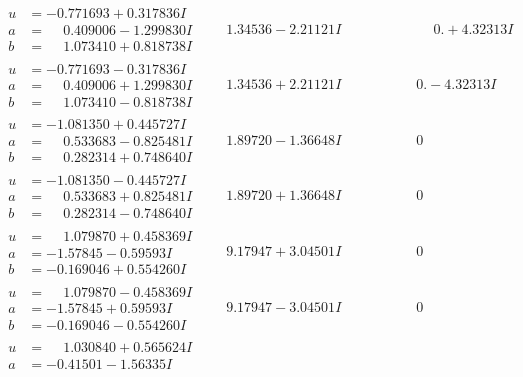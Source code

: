 \documentclass[1p]{elsarticle_modified}
\theoremstyle{definition}
\begin{document}
$$\begin{array}{c|c|c}
 \hline 
\begin{aligned}
u &= -0.771693 + 0.317836 I \\
a &= \phantom{-}0.409006 - 1.299830 I \\
b &= \phantom{-}1.073410 + 0.818738 I\end{aligned}
 & \phantom{-}1.34536 - 2.21121 I & \phantom{-0.000000 -}0. + 4.32313 I \\ \hline\begin{aligned}
u &= -0.771693 - 0.317836 I \\
a &= \phantom{-}0.409006 + 1.299830 I \\
b &= \phantom{-}1.073410 - 0.818738 I\end{aligned}
 & \phantom{-}1.34536 + 2.21121 I & \phantom{-0.000000 } 0. - 4.32313 I \\ \hline\begin{aligned}
u &= -1.081350 + 0.445727 I \\
a &= \phantom{-}0.533683 - 0.825481 I \\
b &= \phantom{-}0.282314 + 0.748640 I\end{aligned}
 & \phantom{-}1.89720 - 1.36648 I & \phantom{-0.000000 } 0 \\ \hline\begin{aligned}
u &= -1.081350 - 0.445727 I \\
a &= \phantom{-}0.533683 + 0.825481 I \\
b &= \phantom{-}0.282314 - 0.748640 I\end{aligned}
 & \phantom{-}1.89720 + 1.36648 I & \phantom{-0.000000 } 0 \\ \hline\begin{aligned}
u &= \phantom{-}1.079870 + 0.458369 I \\
a &= -1.57845 - 0.59593 I \\
b &= -0.169046 + 0.554260 I\end{aligned}
 & \phantom{-}9.17947 + 3.04501 I & \phantom{-0.000000 } 0 \\ \hline\begin{aligned}
u &= \phantom{-}1.079870 - 0.458369 I \\
a &= -1.57845 + 0.59593 I \\
b &= -0.169046 - 0.554260 I\end{aligned}
 & \phantom{-}9.17947 - 3.04501 I & \phantom{-0.000000 } 0 \\ \hline\begin{aligned}
u &= \phantom{-}1.030840 + 0.565624 I \\
a &= -0.41501 - 1.56335 I \\

\end{aligned}
\end{array}$$
\end{document}

